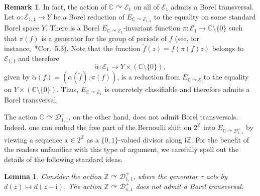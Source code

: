 \documentclass[12pt]{paper}
\numberwithin{equation}{section}
\theoremstyle{plain}
\newtheorem{lemma}[theorem]{Lemma}
\theoremstyle{definition}
\newtheorem{remark}[theorem]{Remark}
\newcommand{\C}{\mathbb{C}}
\newcommand{\Z}{\mathbb{Z}}
\newcommand{\im}{\mathrm{i}} %
\newcommand{\holom}[1][]{\mathcal{E}_{#1}}
\newcommand{\divis}[1][]{\mathcal{D}_{#1}}
\newcommand{\divisp}[1][]{\divis[#1]^{+}}
\newcommand{\acts}{\curvearrowright}
\begin{document}
\begin{remark}
  \label{rem:1-periodic-borel-transversal}
  In fact, the action of \(\C \acts \holom[1]\) on all of \(\holom[1]\) admits a Borel transversal.
  Let \(\alpha : \holom[1,1] \to Y\) be a Borel reduction of \(E_{\C \acts \holom[1,1]}\) to the
  equality on some standard Borel space \(Y\).  There is a Borel
  \(E_{\C \acts \holom[1]}\)-invariant function \(\pi : \holom[1] \to \C\setminus \{0\}\) such that
  \(\pi(f)\) is a generator for the group of periods of \(f\) (see, for
  instance,~\cite{Slutsky}*{Cor.~5.3}).  Note that the function \(\widetilde{f}(z) = f(\pi(f)z) \)
  belongs to \(\holom[1,1]\) and therefore
  \[\widetilde{\alpha} : \holom[1] \to Y \times (\C\setminus \{0\}),\] given by
  \(\widetilde{\alpha}(f) = (\alpha(\widetilde{f}), \pi(f))\), is a reduction from
  \(E_{\C \acts \holom[1]}\)to the equality on \(Y \times (\C\setminus \{0\})\). Thus,
  \(E_{\C \acts \holom[1]}\) is concretely classifiable and therefore admits a Borel transversal.
\end{remark}

The action \(\C \acts \divisp[1,1]\), on the other hand, does not admit Borel transversals.  Indeed,
one can embed the free part of the Bernoulli shift on \(2^{\Z}\) into \(E_{\C \acts \divisp[1,1]}\)
by viewing a sequence \(x \in 2^{\Z}\) as a \(\{0,1\}\)-valued divisor along \(\im \Z\).  For the
benefit of the readers unfamiliar with this type of argument, we carefully spell out the details of
the following standard ideas.

\begin{lemma}
  \label{lem:D11-no-transversal}
  Consider the action \(\Z \acts \divisp[1,1]\), where the generator \(\tau\) acts by
  \(d(z) \mapsto d(z-\im)\).  The action \(\Z\acts \divisp[1,1]\) does not admit a Borel
  transversal.
\end{lemma}
\end{document}

